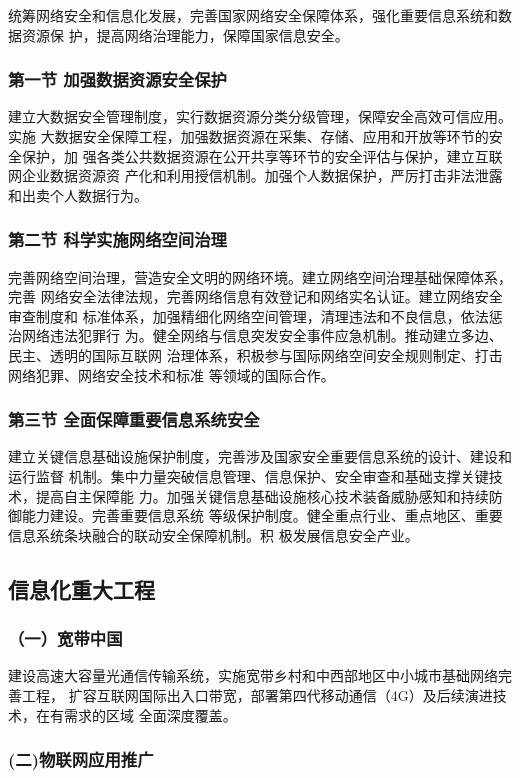 \documentclass[11pt]{ctexart}
\begin{document}
{{{{统筹网络安全和信息化发展，完善国家网络安全保障体系，强化重要信息系统和数据资源保
护，提高网络治理能力，保障国家信息安全。
\subsubsection{第一节 加强数据资源安全保护}
\label{sec:org456daf0}
建立大数据安全管理制度，实行数据资源分类分级管理，保障安全高效可信应用。实施
大数据安全保障工程，加强数据资源在采集、存储、应用和开放等环节的安全保护，加
强各类公共数据资源在公开共享等环节的安全评估与保护，建立互联网企业数据资源资
产化和利用授信机制。加强个人数据保护，严厉打击非法泄露和出卖个人数据行为。
\subsubsection{第二节 科学实施网络空间治理}
\label{sec:orgb0dda9d}
完善网络空间治理，营造安全文明的网络环境。建立网络空间治理基础保障体系，完善
网络安全法律法规，完善网络信息有效登记和网络实名认证。建立网络安全审查制度和
标准体系，加强精细化网络空间管理，清理违法和不良信息，依法惩治网络违法犯罪行
为。健全网络与信息突发安全事件应急机制。推动建立多边、民主、透明的国际互联网
治理体系，积极参与国际网络空间安全规则制定、打击网络犯罪、网络安全技术和标准
等领域的国际合作。
\subsubsection{第三节 全面保障重要信息系统安全}
\label{sec:org71e8a00}

建立关键信息基础设施保护制度，完善涉及国家安全重要信息系统的设计、建设和运行监督
机制。集中力量突破信息管理、信息保护、安全审查和基础支撑关键技术，提高自主保障能
力。加强关键信息基础设施核心技术装备威胁感知和持续防御能力建设。完善重要信息系统
等级保护制度。健全重点行业、重点地区、重要信息系统条块融合的联动安全保障机制。积
极发展信息安全产业。
\subsection{信息化重大工程}
\label{sec:orgd206e9a}
\subsubsection{（一）宽带中国}
\label{sec:org42a0f64}
建设高速大容量光通信传输系统，实施宽带乡村和中西部地区中小城市基础网络完善工程，
扩容互联网国际出入口带宽，部署第四代移动通信（4G）及后续演进技术，在有需求的区域
全面深度覆盖。
\subsubsection{(二)物联网应用推广}
\label{sec:orga139aba}

}}}}
\end{document}
